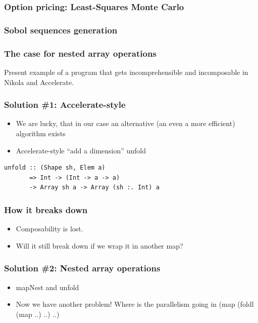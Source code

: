 \documentclass{beamer}
\begin{document}
\begin{frame}
  \frametitle{Option pricing: Least-Squares Monte Carlo}
  
\end{frame}

\begin{frame}
  \frametitle{Sobol sequences generation}
  
\end{frame}

\begin{frame}
  \frametitle{The case for nested array operations}
  Present example of a program that gets incomprehensible and
  incomposable in Nikola and Accelerate.
\end{frame}

\begin{frame}[fragile]
  \frametitle{Solution \#1: Accelerate-style}
  \begin{itemize}
  \item We are lucky, that in our case an alternative (an even a
    more efficient) algorithm
    exists
  \item Accelerate-style ``add a dimension'' unfold
  \end{itemize}

{\footnotesize
\begin{verbatim}
unfold :: (Shape sh, Elem a)
       => Int -> (Int -> a -> a)
       -> Array sh a -> Array (sh :. Int) a
\end{verbatim} }

\end{frame}

\begin{frame}
  \frametitle{How it breaks down}
  \begin{itemize}
  \item Composability is lost.
  \item Will it still break down if we wrap it in another map?
  \end{itemize}
\end{frame}

\begin{frame}
  \frametitle{Solution \#2: Nested array operations}
  \begin{itemize}
  \item mapNest and unfold
  \item Now we have another problem! Where is the parallelism going in (map (foldl (map ..) ..) ..)
  \end{itemize}
\end{frame}
\end{document}
